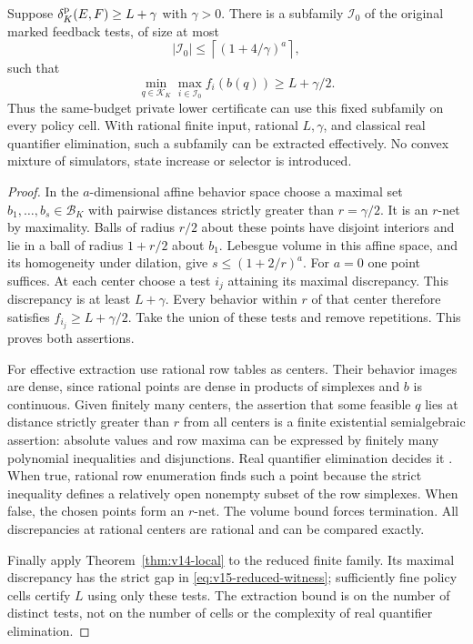 \begin{theorem}
\label{thm:v15-witness}
Suppose $\delta^{\rm p}_K(E,F)\ge L+\gamma$ with $\gamma>0$. There is a subfamily
$\mathcal I_0$ of the original marked feedback tests, of size at most
\begin{equation}\label{eq:v15-witness-count}
 |\mathcal I_0|\le \left\lceil(1+4/\gamma)^a\right\rceil,
\end{equation}
such that
\begin{equation}\label{eq:v15-reduced-witness}
 \min_{q\in\mathcal K_K}\max_{i\in\mathcal I_0} f_i(b(q))
                                      \ge L+\gamma/2.
\end{equation}
Thus the same-budget private lower certificate can use this fixed
subfamily on every policy cell. With rational finite input, rational
$L,\gamma$, and classical real quantifier elimination, such a subfamily
can be extracted effectively. No convex mixture of simulators, state
increase or selector is introduced.
\end{theorem}
\begin{proof}
In the $a$-dimensional affine behavior space choose a maximal set
$b_1,\ldots,b_s\in\mathcal B_K$ with pairwise distances strictly
greater than $r=\gamma/2$. It is an $r$-net by maximality. Balls of
radius $r/2$ about these points have disjoint interiors and lie in a
ball of radius $1+r/2$ about $b_1$. Lebesgue volume in this affine
space, and its homogeneity under dilation, give
$s\le(1+2/r)^a$. For $a=0$ one point suffices. At each center choose a
test $i_j$ attaining its maximal discrepancy. This discrepancy is at
least $L+\gamma$. Every behavior within $r$ of that center therefore
satisfies $f_{i_j}\ge L+\gamma/2$. Take the union of these tests and
remove repetitions. This proves both assertions.

For effective extraction use rational row tables as centers. Their
behavior images are dense, since rational points are dense in products
of simplexes and $b$ is continuous. Given finitely many centers, the
assertion that some feasible $q$ lies at distance strictly greater than
$r$ from all centers is a finite existential semialgebraic assertion:
absolute values and row maxima can be expressed by finitely many
polynomial inequalities and disjunctions. Real quantifier elimination
decides it \cite{Basu2014}. When true, rational row enumeration finds
such a point because the strict inequality defines a relatively open
nonempty subset of the row simplexes. When false, the chosen points
form an $r$-net. The volume bound forces termination. All discrepancies
at rational centers are rational and can be compared exactly.

Finally apply Theorem~\ref{thm:v14-local} to the reduced finite family.
Its maximal discrepancy has the strict gap in
\eqref{eq:v15-reduced-witness}; sufficiently fine policy cells certify
$L$ using only these tests. The extraction bound is on the number of
distinct tests, not on the number of cells or the complexity of real
quantifier elimination.
\end{proof}

